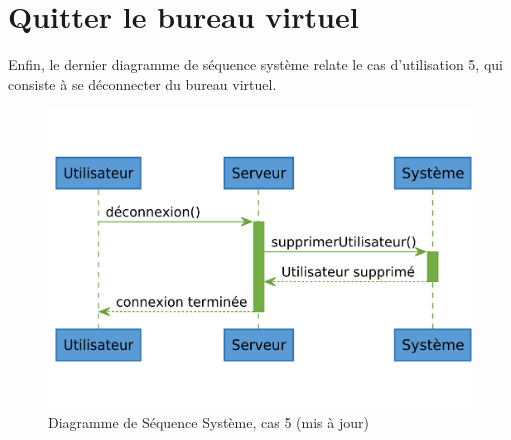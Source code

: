 \section{Quitter le bureau virtuel}

Enfin, le dernier diagramme de séquence système relate le cas d'utilisation
5, qui consiste à se déconnecter du bureau virtuel.

\begin{figure}[h!]
	\centering
	\includegraphics[scale=0.35]{diagrammes/dss5.pdf}
	\caption{\color{ForestGreen}Diagramme de Séquence Système, cas 5 (mis à jour)\color{black}}
\end{figure}
